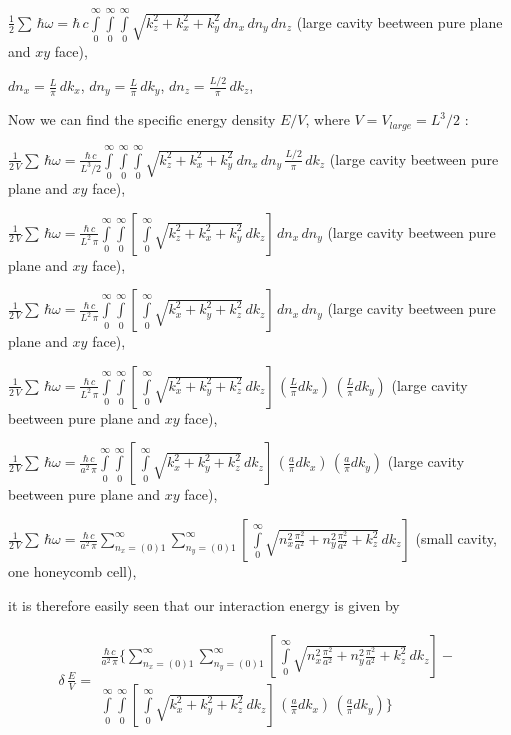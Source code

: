 \documentclass[11pt]{article}
\begin{document}
    \(\frac{1}{2}\sum\,\hbar\omega = \hbar\,c\int\limits_{0}^{\infty}\int\limits_{0}^{\infty}\int\limits_{0}^{\infty}\sqrt{k_z^2+k_x^2+k_y^2}\,d{n_x}\,d{n_y}\,d{n_z}\)
(large cavity beetween pure plane and \(xy\) face),

    \(dn_x = \frac{L}{\pi}\,dk_x\), \(dn_y = \frac{L}{\pi}\,dk_y\),
\(dn_z = \frac{L/2}{\pi}\,dk_z\),

    Now we can find the specific energy density \(E/V\), where
\(V = V_{large} = L^3/2\) :

    \(\frac{1}{2\,V}\sum\,\hbar\omega = \frac{\hbar\,c}{L^3/2}\int\limits_{0}^{\infty}\int\limits_{0}^{\infty}\int\limits_{0}^{\infty}\sqrt{k_z^2+k_x^2+k_y^2}\,dn_x\,dn_y\,\frac{L/2}{\pi}\,dk_z\)
(large cavity beetween pure plane and \(xy\) face),

    \(\frac{1}{2\,V}\sum\,\hbar\omega = \frac{\hbar\,c}{L^2\,\pi}\int\limits_{0}^{\infty}\int\limits_{0}^{\infty}\left[\,\int\limits_{0}^{\infty}\sqrt{k_z^2+k_x^2+k_y^2}\,dk_z\right]\,dn_x\,dn_y\)
(large cavity beetween pure plane and \(xy\) face),

    \(\frac{1}{2\,V}\sum\,\hbar\omega = \frac{\hbar\,c}{L^2\,\pi}\int\limits_{0}^{\infty}\int\limits_{0}^{\infty}\left[\,\int\limits_{0}^{\infty}\sqrt{k_x^2+k_y^2+k_z^2}\,dk_z\right]\,dn_x\,dn_y\)
(large cavity beetween pure plane and \(xy\) face),

    \(\frac{1}{2\,V}\sum\,\hbar\omega = \frac{\hbar\,c}{L^2\,\pi}\int\limits_{0}^{\infty}\int\limits_{0}^{\infty}\left[\,\int\limits_{0}^{\infty}\sqrt{k_x^2+k_y^2+k_z^2}\,dk_z\right]\,\left(\frac{L}{\pi}dk_x\right)\,\left(\frac{L}{\pi}dk_y\right)\)
(large cavity beetween pure plane and \(xy\) face),

    \(\frac{1}{2\,V}\sum\,\hbar\omega = \frac{\hbar\,c}{a^2\,\pi}\int\limits_{0}^{\infty}\int\limits_{0}^{\infty}\left[\,\int\limits_{0}^{\infty}\sqrt{k_x^2+k_y^2+k_z^2}\,dk_z\right]\,\left(\frac{a}{\pi}dk_x\right)\,\left(\frac{a}{\pi}dk_y\right)\)
(large cavity beetween pure plane and \(xy\) face),

    \(\frac{1}{2\,V}\sum\,\hbar\omega = \frac{\hbar\,c}{a^2\,\pi}\sum\limits_{n_x=(0)1}^{\infty}\sum\limits_{n_y=(0)1}^{\infty}\left[\,\int\limits_{0}^{\infty}\sqrt{n_x^2\frac{\pi^2}{a^2}+n_y^2\frac{\pi^2}{a^2}+k_z^2}\,dk_z\right]\)
(small cavity, one honeycomb cell),

    it is therefore easily seen that our interaction energy is given by

    \[\begin{array}{lr}
\delta\,\frac{E}{V} =
\begin{array}{c}
\frac{\hbar\,c}{a^2\,\pi}\Bigg\{\sum\limits_{n_x=(0)1}^{\infty}\sum\limits_{n_y=(0)1}^{\infty}\left[\,\int\limits_{0}^{\infty}\sqrt{n_x^2\frac{\pi^2}{a^2}+n_y^2\frac{\pi^2}{a^2}+k_z^2}\,dk_z\right] - \\
\int\limits_{0}^{\infty}\int\limits_{0}^{\infty}\left[\,\int\limits_{0}^{\infty}\sqrt{k_x^2+k_y^2+k_z^2}\,dk_z\right]\,\left(\frac{a}{\pi}dk_x\right)\,\left(\frac{a}{\pi}dk_y\right)\Bigg\}
\end{array}\end{array}\]
\end{document}
